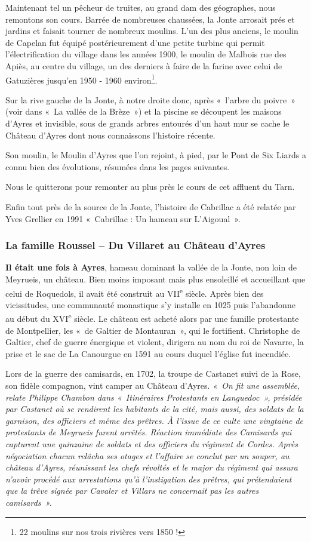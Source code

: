 Maintenant tel un pêcheur de truites, au grand dam des géographes, nous remontons son cours.
Barrée de nombreuses chaussées, la Jonte arrosait prés et jardins et faisait tourner de
nombreux moulins. L’un des plus anciens, le moulin de Capelan fut équipé postérieurement
d’une petite turbine qui permit l’électrification du village dans les années 1900, le moulin de
Malbois rue des Apiès, au centre du village, un des derniers à faire de la farine avec celui de
Gatuzières jusqu’en 1950 - 1960 environ\footnote{22 moulins sur nos trois rivières vers 1850 !}.

Sur la rive gauche de la Jonte, à notre droite donc, après «~l’arbre du poivre~» (voir dans «~La vallée
de la Brèze~») et la piscine se découpent les maisons d’Ayres et invisible, sous de grands arbres
entourés d’un haut mur se cache le Château d’Ayres dont nous connaissons l’histoire récente.

Son moulin, le Moulin d’Ayres que l’on rejoint, à pied, par le Pont de Six Liards a connu bien des évolutions, résumées dans les pages suivantes.

Nous le quitterons pour remonter au plus près le cours de cet affluent du Tarn.

Enfin tout près de la source de la Jonte, l’histoire de Cabrillac a été relatée par Yves Grellier en 1991 «~Cabrillac : Un hameau sur L’Aigoual~».

\subsubsection{La famille Roussel -- Du Villaret au Château d’Ayres}

\textbf{Il était une fois à Ayres}, hameau dominant la vallée de la Jonte, non loin de Meyrueis, un
château. Bien moins imposant mais plus ensoleillé et accueillant que celui de Roquedols, il
avait été construit au VII\textsuperscript{e} siècle. Après bien des vicissitudes, une communauté monastique s’y
installe en 1025 puis l’abandonne au début du XVI\textsuperscript{e} siècle. Le château est acheté alors par une
famille protestante de Montpellier, les «~de Galtier de Montauran~», qui le fortifient.
Christophe de Galtier, chef de guerre énergique et violent, dirigera au nom du roi de Navarre,
la prise et le sac de La Canourgue en 1591 au cours duquel l’église fut incendiée.

Lors de la guerre des camisards, en 1702, la troupe de Castanet suivi de la Rose, son fidèle
compagnon, vint camper au Château d’Ayres. \textit{«~On fit une assemblée, relate Philippe
Chambon dans «~Itinéraires Protestants en Languedoc~», présidée par Castanet où se
rendirent les habitants de la cité, mais aussi, des soldats de la garnison, des officiers et même
des prêtres. À l’issue de ce culte une vingtaine de protestants de Meyrueis furent arrêtés.
Réaction immédiate des Camisards qui capturent une quinzaine de soldats et des officiers du
régiment de Cordes. Après négociation chacun relâcha ses otages et l’affaire se conclut par un souper, au château
d’Ayres, réunissant les chefs révoltés et le major du régiment qui assura n’avoir procédé aux
arrestations qu’à l’instigation des prêtres, qui prétendaient que la trêve signée par Cavaler et
Villars ne concernait pas les autres camisards~».}

